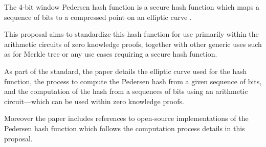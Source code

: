The 4-bit window Pedersen hash function is a secure hash function
which maps a sequence of bits to a compressed point on an elliptic curve \cite{pedersen-gen}.

This proposal aims to standardize this hash function
for use primarily within the arithmetic circuits of zero knowledge proofs,
together with other generic uses such as for Merkle tree or any use cases requiring a secure hash function.

As part of the standard, the paper details the elliptic curve used for the hash function,
the process to compute the Pedersen hash from a given sequence of bits,
and the computation of the hash from a sequences of bits using an arithmetic circuit---which
can be used within zero knowledge proofs.

Moreover the paper includes references to open-source implementations of the %
Pedersen hash function
which follows the computation process details in this proposal.
